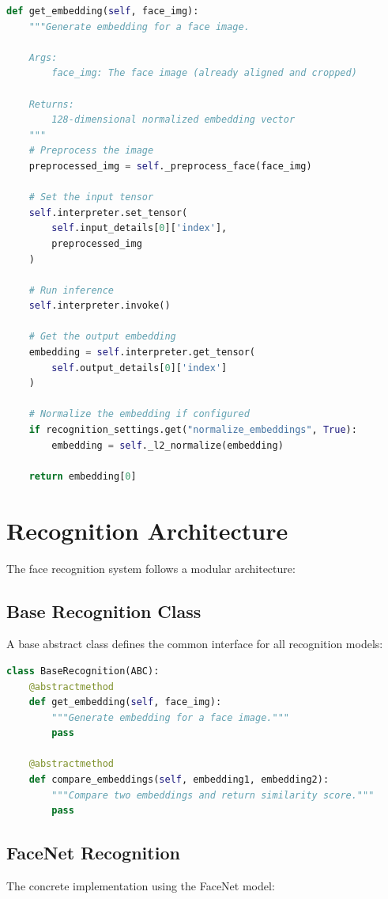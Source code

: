 \begin{lstlisting}[language=Python, caption=Embedding Generation Process]
def get_embedding(self, face_img):
    """Generate embedding for a face image.
    
    Args:
        face_img: The face image (already aligned and cropped)
        
    Returns:
        128-dimensional normalized embedding vector
    """
    # Preprocess the image
    preprocessed_img = self._preprocess_face(face_img)
    
    # Set the input tensor
    self.interpreter.set_tensor(
        self.input_details[0]['index'],
        preprocessed_img
    )
    
    # Run inference
    self.interpreter.invoke()
    
    # Get the output embedding
    embedding = self.interpreter.get_tensor(
        self.output_details[0]['index']
    )
    
    # Normalize the embedding if configured
    if recognition_settings.get("normalize_embeddings", True):
        embedding = self._l2_normalize(embedding)
        
    return embedding[0]
\end{lstlisting}

\section{Recognition Architecture}
The face recognition system follows a modular architecture:

\subsection{Base Recognition Class}
A base abstract class defines the common interface for all recognition models:

\begin{lstlisting}[language=Python, caption=Base Recognition Class]
class BaseRecognition(ABC):
    @abstractmethod
    def get_embedding(self, face_img):
        """Generate embedding for a face image."""
        pass
        
    @abstractmethod
    def compare_embeddings(self, embedding1, embedding2):
        """Compare two embeddings and return similarity score."""
        pass
\end{lstlisting}

\subsection{FaceNet Recognition}
The concrete implementation using the FaceNet model:

